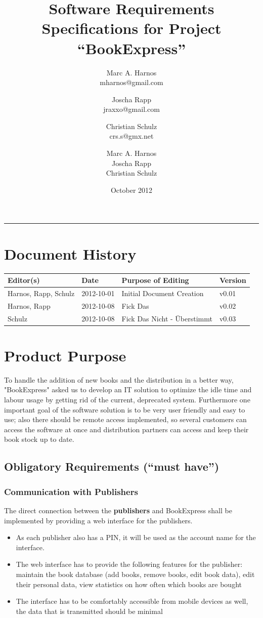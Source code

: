 \documentclass[11pt,a4paper,oneside,svgnames]{report}
\title{Software Requirements Specifications for Project ``BookExpress''}
\author{Marc A. Harnos\\ {mharnos@gmail.com} \and Joscha Rapp\\ {jraxxo@gmail.com} \and Christian Schulz\\ {crs.s@gmx.net}}
\author{Marc A. Harnos\\ Joscha Rapp\\ Christian Schulz}
\date{October 2012}
\makeatletter
\renewcommand{\maketitle}{\begin{titlepage}%
    \let\footnotesize\small
    \let\footnoterule\relax
    \parindent \z@
    \reset@font
    \null\vfil
    \begin{flushleft}
      \huge \@title
    \end{flushleft}
    \par
    \hrule height 4pt
    \par
    \begin{flushright}
      \LARGE \@author \par
    \end{flushright}
    \vskip 60\p@
    \vfil\null
  \end{titlepage}%
  \setcounter{footnote}{0}%
}
\makeatother
\begin{document}
\maketitle
\tableofcontents

\chapter*{Document History}
\begin{tabular}{|l|l|l|l|}
\hline 
Editor(s) & Date & Purpose of Editing & Version \\ 
\hline 
Harnos, Rapp, Schulz & 2012-10-01 & Initial Document Creation & v0.01 \\ 
\hline
Harnos, Rapp & 2012-10-08 & Fick Das & v0.02 \\ 
\hline
Schulz & 2012-10-08 & Fick Das Nicht - Überstimmt & v0.03 \\ 
\hline 
\end{tabular} 

\chapter{Product Purpose}
To handle the addition of new books and the distribution in a better way, "BookExpress" asked us to develop an IT solution to optimize the idle time and labour usage by getting rid of the current, deprecated system. Furthermore one important goal of the software solution is to be very user friendly and easy to use; also there should be remote access implemented, so several customers can access the software at once and distribution partners can access and keep their book stock up to date.
\section{Obligatory Requirements (``must have'')}
\subsection{Communication with Publishers}
The direct connection between the \textbf{publishers} and BookExpress shall be implemented by providing a web interface for the publishers.\\
\begin{itemize}
\item As each publisher also has a PIN, it will be used as the account name for the interface.
\item The web interface has to provide the following features for the publisher: maintain the book database (add books, remove books, edit book data), edit their personal data, view statistics on how often which books are bought
\item The interface has to be comfortably accessible from mobile devices as well, the data that is transmitted should be minimal\\
\end{itemize}
\end{document}
